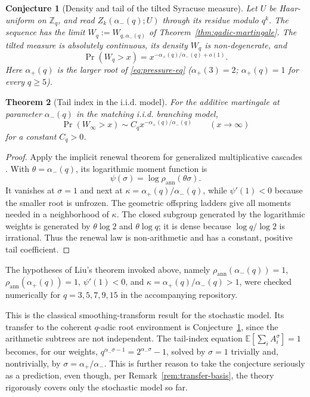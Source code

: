 \documentclass[11pt]{article}
\newtheorem{theorem}{Theorem}[section]
\newtheorem{conjecture}[theorem]{Conjecture}
\theoremstyle{remark}
\begin{document}
\begin{conjecture}[Density and tail of the tilted Syracuse measure]
\label{conj:tail-index}
Let $U$ be Haar-uniform on $\mathbb Z_q$, and read
$Z_k(\alpha_-(q);U)$ through its residue modulo $q^k$. The sequence
has the limit $W_q:=W_{q,\alpha_-(q)}$ of
Theorem~\ref{thm:qadic-martingale}. The tilted
measure is absolutely continuous, its density $W_q$ is non-degenerate,
and
\[
 \Pr(W_q>x)=x^{-\alpha_+(q)/\alpha_-(q)+o(1)}.
\]
Here $\alpha_+(q)$ is the larger root of \eqref{eq:pressure-eq}
($\alpha_+(3)=2$; $\alpha_+(q)=1$ for every $q\ge5$).
\end{conjecture}

\begin{theorem}[Tail index in the i.i.d. model]\label{thm:iid-tail}
For the additive martingale at parameter $\alpha_-(q)$ in the matching
i.i.d. branching model,
\[
 \Pr(W_\infty>x)\sim C_q x^{-\alpha_+(q)/\alpha_-(q)}
 \qquad (x\to\infty)
\]
for a constant $C_q>0$.
\end{theorem}

\begin{proof}
Apply the implicit renewal theorem for generalized multiplicative
cascades \cite{Liu2000}. With $\theta=\alpha_-(q)$, its logarithmic
moment function is
\[
 \psi(\sigma)=\log\rho_{\mathrm{ann}}(\theta \sigma).
\]
It vanishes at $\sigma=1$ and next at
$\kappa=\alpha_+(q)/\alpha_-(q)$, while $\psi'(1)<0$ because the smaller
root is unfrozen. The geometric offspring ladders give all moments
needed in a neighborhood of $\kappa$. The closed subgroup generated by
the logarithmic weights is generated by $\theta\log2$ and
$\theta\log q$; it is dense because $\log q/\log2$ is irrational.
Thus the renewal law is non-arithmetic and has a constant, positive
tail coefficient.
\end{proof}

The hypotheses of Liu's theorem invoked above, namely
$\rho_{\mathrm{ann}}(\alpha_-(q))=1$, $\rho_{\mathrm{ann}}(\alpha_+(q))=1$,
$\psi'(1)<0$, and $\kappa=\alpha_+(q)/\alpha_-(q)>1$, were checked
numerically for $q=3,5,7,9,15$ in the accompanying repository.

This is the classical smoothing-transform result for the stochastic
model. Its transfer to the coherent $q$-adic root environment is
Conjecture~\ref{conj:tail-index}, since the arithmetic subtrees are not
independent.
The tail-index equation $\mathbb{E}[\sum_i A_i^\sigma]=1$ becomes,
for our weights, $q^{\alpha_-\sigma-1}=2^{\alpha_- \sigma}-1$, solved by
$\sigma=1$ trivially and, nontrivially, by
$\sigma=\alpha_+/\alpha_-$. This is further reason to take the conjecture
seriously as a prediction, even though, per
Remark~\ref{rem:transfer-basis}, the theory rigorously covers only the
stochastic model so far.
\end{document}
